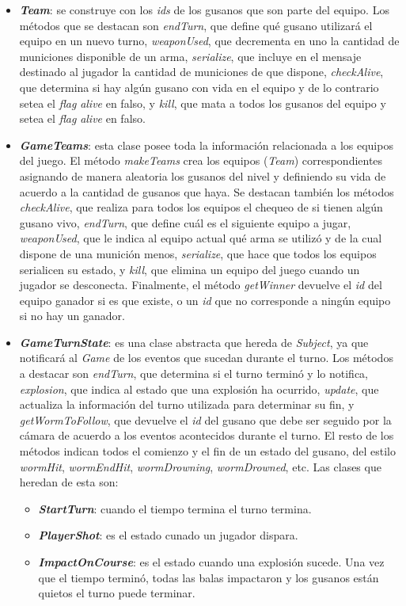 \begin{itemize}
	\item \textbf{\textit{Team}}: se construye con los \textit{ids} de los gusanos que son parte del equipo. Los métodos que se destacan son \textit{endTurn}, que define qué gusano utilizará el equipo en un nuevo turno, \textit{weaponUsed}, que decrementa en uno la cantidad de municiones disponible de un arma, \textit{serialize}, que incluye en el mensaje destinado al jugador la cantidad de municiones de que dispone, \textit{checkAlive}, que determina si hay algún gusano con vida en el equipo y de lo contrario setea el \textit{flag} \textit{alive} en falso, y \textit{kill}, que mata a todos los gusanos del equipo y setea el \textit{flag} \textit{alive} en falso.
	
	\item \textbf{\textit{GameTeams}}: esta clase posee toda la información relacionada a los equipos del juego. El método \textit{makeTeams} crea los equipos (\textit{Team}) correspondientes asignando de manera aleatoria los gusanos del nivel y definiendo su vida de acuerdo a la cantidad de gusanos que haya. Se destacan también los métodos \textit{checkAlive}, que realiza para todos los equipos el chequeo de si tienen algún gusano vivo, \textit{endTurn}, que define cuál es el siguiente equipo a jugar, \textit{weaponUsed}, que le indica al equipo actual qué arma se utilizó y de la cual dispone de una munición menos, \textit{serialize}, que hace que todos los equipos serialicen su estado, y \textit{kill}, que elimina un equipo del juego cuando un jugador se desconecta. Finalmente, el método \textit{getWinner} devuelve el \textit{id} del equipo ganador si es que existe, o un \textit{id} que no corresponde a ningún equipo si no hay un ganador.
	
	\item \textbf{\textit{GameTurnState}}: es una clase abstracta que hereda de \textit{Subject}, ya que notificará al \textit{Game} de los eventos que sucedan durante el turno. Los métodos a destacar son \textit{endTurn}, que determina si el turno terminó y lo notifica, \textit{explosion}, que indica al estado que una explosión ha ocurrido, \textit{update}, que actualiza la información del turno utilizada para determinar su fin, y \textit{getWormToFollow}, que devuelve el \textit{id} del gusano que debe ser seguido por la cámara de acuerdo a los eventos acontecidos durante el turno. El resto de los métodos indican todos el comienzo y el fin de un estado del gusano, del estilo \textit{wormHit}, \textit{wormEndHit}, \textit{wormDrowning}, \textit{wormDrowned}, etc. Las clases que heredan de esta son:
	\begin{itemize}
		\item \textbf{\textit{StartTurn}}: cuando el tiempo termina el turno termina.
		\item \textbf{\textit{PlayerShot}}: es el estado cunado un jugador dispara.
		\item \textbf{\textit{ImpactOnCourse}}: es el estado cuando una explosión sucede. Una vez que el tiempo terminó, todas las balas impactaron y los gusanos están quietos el turno puede terminar.
	\end{itemize}
	

\end{itemize}
